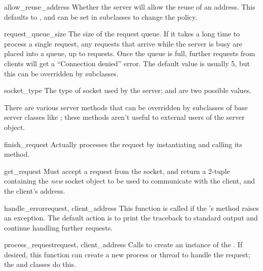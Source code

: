 \begin{datadesc}{allow_reuse_address}
Whether the server will allow the reuse of an address. This defaults
to , and can be set in subclasses to change the policy.
\end{datadesc}

\begin{datadesc}{request_queue_size}
The size of the request queue.  If it takes a long time to process a
single request, any requests that arrive while the server is busy are
placed into a queue, up to  requests.  Once
the queue is full, further requests from clients will get a
``Connection denied'' error.  The default value is usually 5, but this
can be overridden by subclasses.
\end{datadesc}

\begin{datadesc}{socket_type}
The type of socket used by the server; 
and  are two possible values.
\end{datadesc}

There are various server methods that can be overridden by subclasses
of base server classes like ; these methods aren't
useful to external users of the server object.


\begin{funcdesc}{finish_request}{}
Actually processes the request by instantiating
 and calling its  method.
\end{funcdesc}

\begin{funcdesc}{get_request}{}
Must accept a request from the socket, and return a 2-tuple containing
the \emph{new} socket object to be used to communicate with the
client, and the client's address.
\end{funcdesc}

\begin{funcdesc}{handle_error}{request, client_address}
This function is called if the 's
 method raises an exception.  The default action is
to print the traceback to standard output and continue handling
further requests.
\end{funcdesc}

\begin{funcdesc}{process_request}{request, client_address}
Calls  to create an instance of the
.  If desired, this function can create a
new process or thread to handle the request; the 
and  classes do this.
\end{funcdesc}

